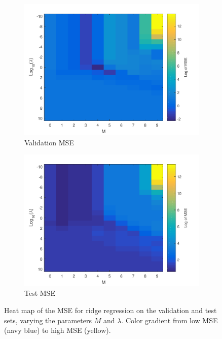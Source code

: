 \begin{figure}[h!]
\centering
    \begin{subfigure}[b]{0.4\textwidth}
	\includegraphics[scale=0.55]{hw1_3_2.pdf}
	\caption{Validation MSE}
    \end{subfigure}
    \quad
    \begin{subfigure}[b]{0.4\textwidth}
	\includegraphics[scale=0.55]{hw1_3_2b.pdf}
	\caption{Test MSE}
    \end{subfigure}
\caption{Heat map of the MSE for ridge regression on the validation and test sets, varying the parameters $M$ and $\lambda$.  Color gradient from low MSE (navy blue) to high MSE (yellow).} \label{fig:heat_map}
\end{figure}

